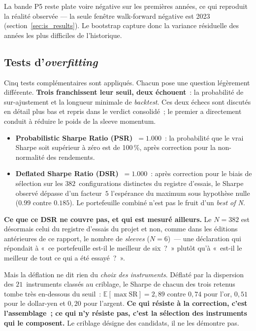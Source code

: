 La bande P5 reste plate voire négative sur les premières années, ce qui reproduit la réalité observée --- la seule fenêtre walk-forward négative est 2023 (section~\ref{sec:is_results}). Le bootstrap capture donc la variance résiduelle des années les plus difficiles de l'historique.

\subsection{Tests d'\emph{overfitting}}

Cinq tests complémentaires sont appliqués. Chacun pose une question légèrement différente. \textbf{Trois franchissent leur seuil, deux échouent}~: la probabilité de sur-ajustement et la longueur minimale de \emph{backtest}. Ces deux échecs sont discutés en détail plus bas et repris dans le verdict consolidé~; le premier a directement conduit à réduire le poids de la sleeve momentum.



\begin{itemize}
\item \textbf{Probabilistic Sharpe Ratio (PSR)~$= 1.000$}~: la probabilité que le vrai Sharpe soit supérieur à zéro est de 100\,\%, après correction pour la non-normalité des rendements.
\item \textbf{Deflated Sharpe Ratio (DSR)~$= 1.000$}~: après correction pour le biais de sélection sur les $382$~configurations distinctes du registre d'essais, le Sharpe observé dépasse d'un facteur~$5$ l'espérance du maximum sous hypothèse nulle ($0.99$ contre $0.185$). Le portefeuille combiné n'est pas le fruit d'un \emph{best of N}.
\end{itemize}

\begin{warningbox}
\textbf{Ce que ce DSR ne couvre pas, et qui est mesuré ailleurs.} Le $N = 382$ est désormais celui du registre d'essais du projet et non, comme dans les éditions antérieures de ce rapport, le nombre de \emph{sleeves} ($N=6$)~--- une déclaration qui répondait à «~ce portefeuille est-il le meilleur de six~?~» plutôt qu'à «~est-il le meilleur de tout ce qui a été essayé~?~».

Mais la déflation ne dit rien du \emph{choix des instruments}. Déflaté par la dispersion des $21$~instruments classés au criblage, le Sharpe de chacun des trois retenus tombe très en-dessous du seuil~: $\mathbb{E}[\max \mathrm{SR}] = 2{,}89$ contre $0{,}74$ pour l'or, $0{,}51$ pour le dollar-yen et $0{,}20$ pour l'argent. \textbf{Ce qui résiste à la correction, c'est l'assemblage~; ce qui n'y résiste pas, c'est la sélection des instruments qui le composent.} Le criblage désigne des candidats, il ne les démontre pas.
\end{warningbox}


